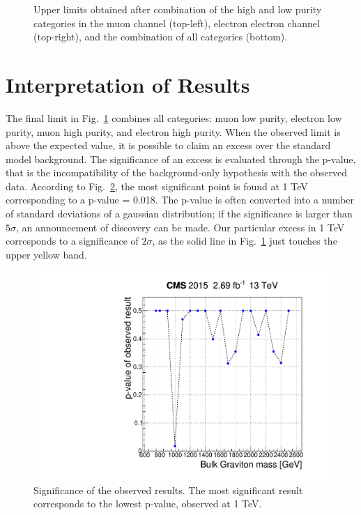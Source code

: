 \begin{figure}[h]
\caption[Upper limits combination]{Upper limits obtained after combination of the high and low purity categories in the muon channel (top-left), electron electron channel (top-right), and the combination of all categories (bottom).}
\label{combine_VZ}
\end{figure}

\clearpage
\section{Interpretation of Results}
The final limit in Fig.~\ref{combine_VZ} combines all categories: muon low purity, electron low purity, muon high purity, and electron high purity. When the observed limit is above the expected value, it is possible to claim an excess over the standard model background. The significance of an excess is evaluated through the p-value, that is the incompatibility of the background-only hypothesis with the observed data. According to Fig.~\ref{significance}, the most significant point is found at 1 TeV corresponding to a p-value = 0.018. The p-value is often converted into a number of standard deviations of a gaussian distribution; if the significance is larger than $5\sigma$, an announcement of discovery can be made. Our particular excess in 1 TeV corresponds to a significance of $2\sigma$, as the solid line in Fig.~\ref{combine_VZ} just touches the upper yellow band.

\begin{figure}[h]
\centering
\includegraphics[scale=0.5]{figures/limits/signifANP.pdf}
\caption[Significance]{Significance of the observed results. The most significant result corresponds to the lowest p-value, observed at 1 TeV.}
\label{significance}
\end{figure}


